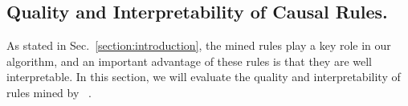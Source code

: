 
\subsection{Quality and Interpretability  of Causal Rules.}

As stated in Sec.~\ref{section:introduction}, the mined rules play a key role in our algorithm, and an important advantage of these rules is that they are well interpretable.
In this section, we will evaluate the quality and interpretability of rules mined by \dname~.






